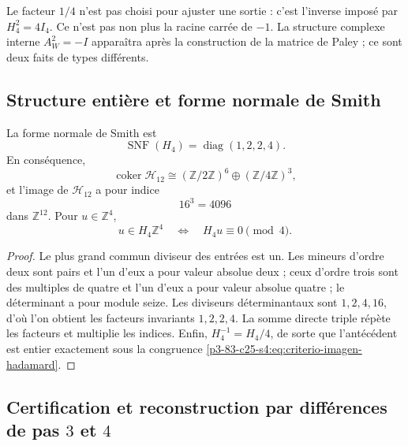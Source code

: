Le facteur \(1/4\) n’est pas choisi pour ajuster une sortie : c’est l’inverse
imposé par \(H_4^2=4I_4\). Ce n’est pas non plus la racine carrée de \(-1\). La
structure complexe interne \(A_W^2=-I\) apparaîtra après la construction de la
matrice de Paley ; ce sont deux faits de types différents.

\subsection{Structure entière et forme normale de Smith}

\begin{theorem}
\label{p3-83-c25-s4:thm:smith-hadamard-autonomo}
La forme normale de Smith est
\begin{equation}
 \operatorname{SNF}(H_4)=\operatorname{diag}(1,2,2,4).
 \label{p3-83-c25-s4:eq:snf-hadamard-autonoma}
\end{equation}
En conséquence,
\begin{equation}
 \operatorname{coker}\mathcal H_{12}
 \cong(\mathbb Z/2\mathbb Z)^6
 \oplus(\mathbb Z/4\mathbb Z)^3,
 \label{p3-83-c25-s4:eq:cociente-hadamard-doce}
\end{equation}
et l’image de \(\mathcal H_{12}\) a pour indice
\[
 16^3=4096
\]
dans \(\mathbb Z^{12}\). Pour \(u\in\mathbb Z^4\),
\begin{equation}
 u\in H_4\mathbb Z^4
 \quad\Longleftrightarrow\quad
 H_4u\equiv0\pmod4.
 \label{p3-83-c25-s4:eq:criterio-imagen-hadamard}
\end{equation}
\end{theorem}

\begin{proof}
Le plus grand commun diviseur des entrées est un. Les mineurs d’ordre deux sont
pairs et l’un d’eux a pour valeur absolue deux ; ceux d’ordre trois sont des multiples de
quatre et l’un d’eux a pour valeur absolue quatre ; le déterminant a pour module
seize. Les diviseurs déterminantaux sont \(1,2,4,16\), d’où l’on obtient
les facteurs invariants \(1,2,2,4\). La somme directe triple répète les
facteurs et multiplie les indices. Enfin,
\(H_4^{-1}=H_4/4\), de sorte que l’antécédent est entier exactement sous la
congruence \eqref{p3-83-c25-s4:eq:criterio-imagen-hadamard}.
\end{proof}

\subsection{Certification et reconstruction par différences de pas \(3\) et \(4\)}

